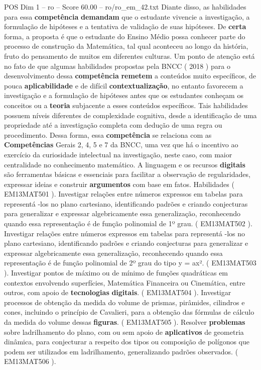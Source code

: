 \begin{textsample}{POS Dim 1 – ro – Score 60.00 – ro/ro\_em\_42.txt}
Diante disso, as habilidades para essa \textbf{competência} \textbf{demandam} que o estudante vivencie a investigação, a formulação de hipóteses e a tentativa de validação de suas hipóteses.
De \textbf{certa} forma, a proposta é que o estudante do Ensino Médio possa conhecer parte do processo de construção da Matemática, tal qual aconteceu ao longo da história, fruto do pensamento de muitos em diferentes culturas.
Um ponto de atenção está no fato de que algumas habilidades propostas pela BNCC ( 2018 ) para o desenvolvimento dessa \textbf{competência} \textbf{remetem} a conteúdos muito específicos, de pouca \textbf{aplicabilidade} e de difícil \textbf{contextualização}, no entanto favorecem a investigação e a formulação de hipóteses antes que os estudantes conheçam os conceitos ou a \textbf{teoria} subjacente a esses conteúdos específicos.
Tais habilidades possuem níveis diferentes de complexidade cognitiva, desde a identificação de uma propriedade até a investigação completa com dedução de uma regra ou procedimento.
Dessa forma, essa \textbf{competência} se relaciona com as \textbf{Competências} Gerais 2, 4, 5 e 7 da BNCC, uma vez que há o incentivo ao exercício da curiosidade intelectual na investigação, neste caso, com maior centralidade no conhecimento matemático.
A linguagem e os recursos \textbf{digitais} são ferramentas básicas e essenciais para facilitar a observação de regularidades, expressar ideias e construir \textbf{argumentos} com base em fatos.
Habilidades ( EM13MAT501 ).
Investigar relações entre números expressos em tabelas para representá -los no plano cartesiano, identificando padrões e criando conjecturas para generalizar e expressar algebricamente essa generalização, reconhecendo quando essa representação é de função polinomial de 1º grau. ( EM13MAT502 ).
Investigar relações entre números expressos em tabelas para representá -los no plano cartesiano, identificando padrões e criando conjecturas para generalizar e expressar algebricamente essa generalização, reconhecendo quando essa representação é de função polinomial de 2º grau do tipo y = ax². ( EM13MAT503 ).
Investigar pontos de máximo ou de mínimo de funções quadráticas em contextos envolvendo superfícies, Matemática Financeira ou Cinemática, entre outros, com apoio de \textbf{tecnologias} \textbf{digitais}. ( EM13MAT504 ).
Investigar processos de obtenção da medida do volume de prismas, pirâmides, cilindros e cones, incluindo o princípio de Cavalieri, para a obtenção das fórmulas de cálculo da medida do volume dessas \textbf{figuras}. ( EM13MAT505 ).
Resolver \textbf{problemas} sobre ladrilhamento do plano, com ou sem apoio de \textbf{aplicativos} de geometria dinâmica, para conjecturar a respeito dos tipos ou composição de polígonos que podem ser utilizados em ladrilhamento, generalizando padrões observados. ( EM13MAT506 ).

\end{textsample}
